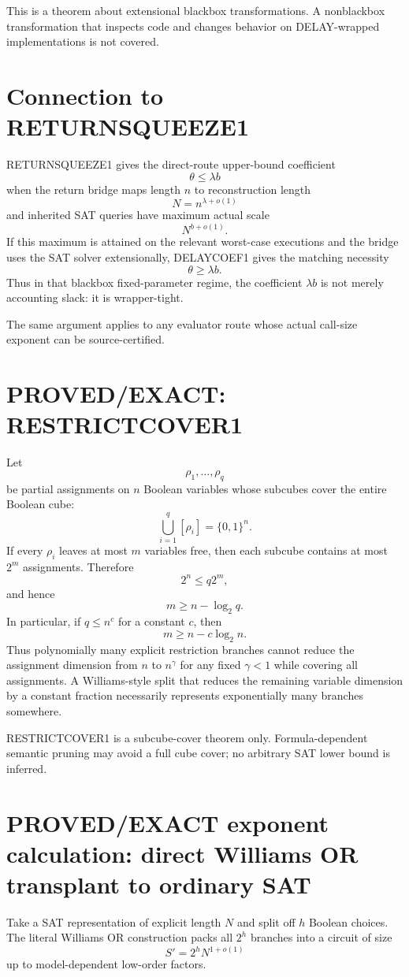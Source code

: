 \documentclass[11pt]{article}
\begin{document}
This is a theorem about extensional blackbox transformations. A nonblackbox transformation that inspects code and changes behavior on DELAY-wrapped implementations is not covered.

\section*{Connection to RETURNSQUEEZE1}
RETURNSQUEEZE1 gives the direct-route upper-bound coefficient
\[
\theta\le\lambda b
\]
when the return bridge maps length \(n\) to reconstruction length
\[
N=n^{\lambda+o(1)}
\]
and inherited SAT queries have maximum actual scale
\[
N^{b+o(1)}.
\]
If this maximum is attained on the relevant worst-case executions and the bridge uses the SAT solver extensionally, DELAYCOEF1 gives the matching necessity
\[
\theta\ge\lambda b.
\]
Thus in that blackbox fixed-parameter regime, the coefficient \(\lambda b\) is not merely accounting slack: it is wrapper-tight.

The same argument applies to any evaluator route whose actual call-size exponent can be source-certified.

\section*{PROVED/EXACT: RESTRICTCOVER1}
Let
\[
\rho_1,\ldots,\rho_q
\]
be partial assignments on \(n\) Boolean variables whose subcubes cover the entire Boolean cube:
\[
\bigcup_{i=1}^q[\rho_i]=\{0,1\}^n.
\]
If every \(\rho_i\) leaves at most \(m\) variables free, then each subcube contains at most \(2^m\) assignments. Therefore
\[
2^n\le q2^m,
\]
and hence
\[
\boxed{m\ge n-\log_2q.}
\]
In particular, if \(q\le n^c\) for a constant \(c\), then
\[
\boxed{m\ge n-c\log_2n.}
\]
Thus polynomially many explicit restriction branches cannot reduce the assignment dimension from \(n\) to \(n^\gamma\) for any fixed \(\gamma<1\) while covering all assignments. A Williams-style split that reduces the remaining variable dimension by a constant fraction necessarily represents exponentially many branches somewhere.

RESTRICTCOVER1 is a subcube-cover theorem only. Formula-dependent semantic pruning may avoid a full cube cover; no arbitrary SAT lower bound is inferred.

\section*{PROVED/EXACT exponent calculation: direct Williams OR transplant to ordinary SAT}
Take a SAT representation of explicit length \(N\) and split off \(h\) Boolean choices. The literal Williams OR construction packs all \(2^h\) branches into a circuit of size
\[
S'=2^{h}N^{1+o(1)}
\]
up to model-dependent low-order factors.
\end{document}
